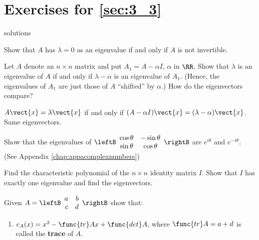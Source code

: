 \section*{Exercises for \ref{sec:3_3}}

\begin{Filesave}{solutions}
\end{Filesave}

\begin{multicols}{2}

\begin{ex}
Show that $A$ has $\lambda = 0$ as an eigenvalue if and only if $A$ is not invertible.
\end{ex}

\begin{ex}
Let $A$ denote an $n \times n$ matrix and put $A_{1} = A - \alpha I$, $\alpha$ in $\RR$. Show that $\lambda$ is an eigenvalue of $A$ if and only if $\lambda -\alpha$ is an eigenvalue of $A_{1}$. (Hence, the eigenvalues of $A_{1}$ are just those of $A$ ``shifted'' by $\alpha$.) How do the eigenvectors compare?

\begin{sol}
$A\vect{x} = \lambda\vect{x}$ if and only if $(A - \alpha I)\vect{x} = (\lambda -  \alpha)\vect{x}$. Same eigenvectors.
\end{sol}
\end{ex}

\begin{ex}
Show that the eigenvalues of $\leftB \begin{array}{cc}
\cos \theta & -\sin \theta \\
\sin \theta & \cos \theta 
\end{array} \rightB$ 
 are $e^{i\theta}$ and $e^{-i\theta}$. \newline (See Appendix \ref{chap:appacomplexnumbers})
\end{ex}

\begin{ex}
Find the characteristic polynomial of the $n \times n$ identity matrix $I$. Show that $I$ has exactly one eigenvalue and find the eigenvectors.
\end{ex}

\begin{ex}
Given $A = \leftB \begin{array}{rr}
a & b \\
c & d
\end{array} \rightB$
 show that:


\begin{enumerate}[label={\alph*.}]
\item $c_{A}(x) = x^{2} - \func{tr } Ax + \func{det }A$, where $\func{tr } A = a + d$ is called the \textbf{trace} of $A$.


\end{enumerate}
\end{ex}
\end{multicols}

